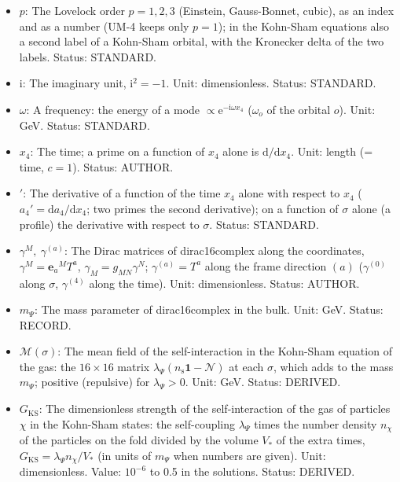 \documentclass[
  10pt,
]{article}
\begin{document}
\begin{itemize}
  runs over the orbitals or the modes. Status: STANDARD.
\item
  \(p\): The Lovelock order \(p = 1, 2, 3\) (Einstein, Gauss-Bonnet,
  cubic), as an index and as a number (UM-4 keeps only \(p = 1\)); in
  the Kohn-Sham equations also a second label of a Kohn-Sham orbital,
  with the Kronecker delta of the two labels. Status: STANDARD.
\item
  \(\mathrm{i}\): The imaginary unit, \(\mathrm{i}^2 = -1\). Unit:
  dimensionless. Status: STANDARD.
\item
  \(\omega\): A frequency: the energy of a mode
  \(\propto \mathrm{e}^{-\mathrm{i}\omega x_4}\) (\(\omega_o\) of the
  orbital \(o\)). Unit: GeV. Status: STANDARD.
\item
  \(x_4\): The time; a prime on a function of \(x_4\) alone is
  \(\mathrm{d}/\mathrm{d}x_4\). Unit: length (= time, \(c = 1\)).
  Status: AUTHOR.
\item
  \({}'\): The derivative of a function of the time \(x_4\) alone with
  respect to \(x_4\) (\(a_4' = \mathrm{d}a_4/\mathrm{d}x_4\); two primes
  the second derivative); on a function of \(\sigma\) alone (a profile)
  the derivative with respect to \(\sigma\). Status: STANDARD.
\item
  \(\gamma^M,\ \gamma^{(a)}\): The Dirac matrices of dirac16complex
  along the coordinates, \(\gamma^M = \mathbf{e}_a{}^MT^a\),
  \(\gamma_M = g_{MN}\gamma^N\); \(\gamma^{(a)} = T^a\) along the frame
  direction \((a)\) (\(\gamma^{(0)}\) along \(\sigma\), \(\gamma^{(4)}\)
  along the time). Unit: dimensionless. Status: AUTHOR.
\item
  \(m_\Psi\): The mass parameter of dirac16complex in the bulk. Unit:
  GeV. Status: RECORD.
\item
  \(\mathcal{M}(\sigma)\): The mean field of the self-interaction in the
  Kohn-Sham equation of the gas: the \(16 \times 16\) matrix
  \(\lambda_\Psi(n_{\mathrm{s}}\mathbf{1} - \mathcal{N})\) at each
  \(\sigma\), which adds to the mass \(m_\Psi\); positive (repulsive)
  for \(\lambda_\Psi > 0\). Unit: GeV. Status: DERIVED.
\item
  \(G_{\mathrm{KS}}\): The dimensionless strength of the
  self-interaction of the gas of particles \(\chi\) in the Kohn-Sham
  states: the self-coupling \(\lambda_\Psi\) times the number density
  \(n_\chi\) of the particles on the fold divided by the volume \(V_*\)
  of the extra times, \(G_{\mathrm{KS}} = \lambda_\Psi n_\chi/V_*\) (in
  units of \(m_\Psi\) when numbers are given). Unit: dimensionless.
  Value: \(10^{-6}\) to 0.5 in the solutions. Status: DERIVED.

\end{itemize}
\end{document}

